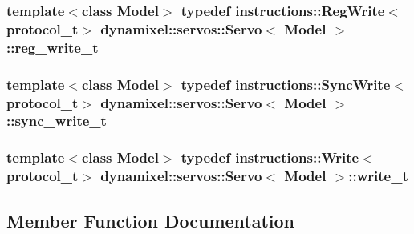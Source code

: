 \subsubsection[{reg\+\_\+write\+\_\+t}]{\setlength{\rightskip}{0pt plus 5cm}template$<$class Model$>$ typedef {\bf instructions\+::\+Reg\+Write}$<${\bf protocol\+\_\+t}$>$ {\bf dynamixel\+::servos\+::\+Servo}$<$ Model $>$\+::{\bf reg\+\_\+write\+\_\+t}}\label{classdynamixel_1_1servos_1_1_servo_adb8219ecc5a368a3222cf30cd17bb882}
\hypertarget{classdynamixel_1_1servos_1_1_servo_aba1cb665a7f6abd9ba15f10f9264d9c8}{}
\subsubsection[{sync\+\_\+write\+\_\+t}]{\setlength{\rightskip}{0pt plus 5cm}template$<$class Model$>$ typedef {\bf instructions\+::\+Sync\+Write}$<${\bf protocol\+\_\+t}$>$ {\bf dynamixel\+::servos\+::\+Servo}$<$ Model $>$\+::{\bf sync\+\_\+write\+\_\+t}}\label{classdynamixel_1_1servos_1_1_servo_aba1cb665a7f6abd9ba15f10f9264d9c8}
\hypertarget{classdynamixel_1_1servos_1_1_servo_a4d005c64809a7c1ddf3817ca55ef03c2}{}
\subsubsection[{write\+\_\+t}]{\setlength{\rightskip}{0pt plus 5cm}template$<$class Model$>$ typedef {\bf instructions\+::\+Write}$<${\bf protocol\+\_\+t}$>$ {\bf dynamixel\+::servos\+::\+Servo}$<$ Model $>$\+::{\bf write\+\_\+t}}\label{classdynamixel_1_1servos_1_1_servo_a4d005c64809a7c1ddf3817ca55ef03c2}


\subsection{Member Function Documentation}
\hypertarget{classdynamixel_1_1servos_1_1_servo_a164c57e41b366c35c8d1f9d4487415b7}{}
